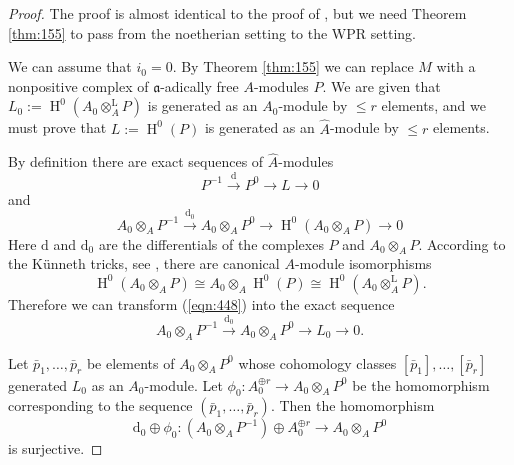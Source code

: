 \documentclass[10pt]{amsart}
\theoremstyle{definition}
\numberwithin{equation}{section}
\newcommand{\xar}{\xrightarrow}
\newcommand{\opn}{\operatorname}
\newcommand{\mfrak}[1]{\mathfrak{#1}}
\newcommand{\mrm}[1]{\mathrm{#1}}
\renewcommand{\a}{\mfrak{a}}
\newcommand{\ot}{\otimes}
\newcommand{\what}[1]{\widehat{#1}}
\renewcommand{\d}{\mathrm{d}}
\begin{document}
\begin{proof}
The proof is almost identical to the proof of \cite[Theorem 2.2]{PSY2},
but we need Theorem \ref{thm:155} to pass from the
noetherian setting to the WPR setting.

We can assume that $i_0 = 0$. By Theorem \ref{thm:155} we can replace $M$
with a nonpositive complex of $\a$-adically free $A$-modules $P$.
We are given that
$L_0 := \opn{H}^0(A_0 \ot^{\mrm{L}}_{A} P)$
is generated as an $A_0$-module by $\leq r$ elements, and we must prove that
$L := \opn{H}^0(P)$ is generated as an $\what{A}$-module by $\leq r$ elements.

By definition there are exact sequences of $\what{A}$-modules
\begin{equation} \label{eqn:447}
P^{-1} \xar{\d} P^0 \to L \to 0
\end{equation}
and
\begin{equation} \label{eqn:448}
A_0 \ot^{}_{A} P^{-1} \xar{\d_0} A_0 \ot^{}_{A} P^0 \to
\opn{H}^0(A_0 \ot^{}_{A} P) \to 0
\end{equation}
Here $\d$ and $\d_0$ are the differentials of the complexes
$P$ and $A_0 \ot^{}_{A} P$.
According to the K\"unneth tricks, see \cite[Theorems 1 and 7]{Ye7}, there are
canonical $A$-module isomorphisms
\begin{equation} \label{eqn:449}
\opn{H}^0(A_0 \ot^{}_{A} P) \cong A_0 \ot^{}_{A} \opn{H}^0(P)
\cong \opn{H}^0(A_0 \ot^{\mrm{L}}_{A} P) .
\end{equation}
Therefore we can transform (\ref{eqn:448}) into the exact sequence
\begin{equation} \label{eqn:450}
A_0 \ot^{}_{A} P^{-1} \xar{\d_0} A_0 \ot^{}_{A} P^0 \to L_0 \to 0 .
\end{equation}

Let $\bar{p}_1, \ldots, \bar{p}_r$ be elements of
$A_0 \ot_{A} P^0$ whose cohomology classes
$[\bar{p}_1], \ldots, [\bar{p}_r]$ generated $L_0$ as an $A_0$-module.
Let
$\phi_0 : A_0^{\oplus r} \to A_0 \ot_{A} P^0$
be the homomorphism corresponding to the sequence
$(\bar{p}_1, \ldots, \bar{p}_r)$.
Then the homomorphism
\begin{equation} \label{eqn:171}
\d_0 \oplus \phi_0 :
(A_0 \ot_{A} P^{-1}) \oplus A_0^{\oplus r} \to A_0 \ot_{A} P^{0}
\end{equation}
is surjective.


\end{proof}
\end{document}

